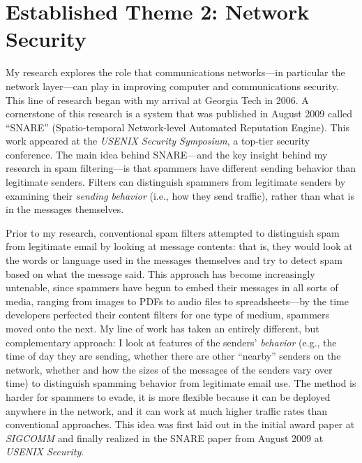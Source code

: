 \section*{Established Theme 2: Network Security}

\fp My research explores the role that communications
networks---in particular the network layer---can play in improving
computer and communications security.  This line of research began with
my arrival at Georgia Tech in 2006. A cornerstone of this
research is a system that was published in August 2009 called ``SNARE''
(Spatio-temporal Network-level Automated Reputation Engine). This work
appeared at the {\em USENIX Security Symposium}, a top-tier security
conference. The main idea behind SNARE---and the key insight behind my
research in spam filtering---is that spammers have different sending
behavior than legitimate senders.  Filters can distinguish
spammers from legitimate senders by examining their {\em sending
behavior} (i.e., how they send traffic), rather than what is in the
messages themselves.

Prior to my research, conventional spam filters attempted to distinguish
spam from legitimate email by looking at message contents: that is, they
would look at the words or language used in the messages themselves and
try to detect spam based on what the message said.  This approach has
become increasingly untenable, since spammers have begun to embed their
messages in all sorts of media, ranging from images to PDFs to audio
files to spreadsheets---by the time developers perfected their content
filters for one type of medium, spammers moved onto the next.  My line
of work has taken an entirely different, but complementary approach: I
look at features of the senders' {\em behavior} (e.g., the time of day
they are sending, whether there are other ``nearby'' senders on the
network, whether and how the sizes of the messages of the senders vary
over time) to distinguish spamming behavior from legitimate email use.
The method is harder for spammers to evade, it is more flexible because
it can be deployed anywhere in the network, and it can work at much
higher traffic rates than conventional approaches.  This idea was first
laid out in the initial award paper at {\em SIGCOMM} and finally
realized in the SNARE paper from August 2009 at {\em USENIX Security}.

